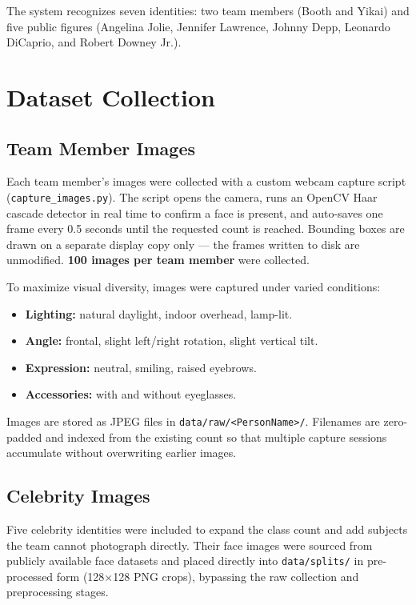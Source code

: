 \documentclass[12pt,a4paper]{article}
\begin{document}
The system recognizes seven identities: two team members (Booth and Yikai) and five public figures (Angelina Jolie, Jennifer Lawrence, Johnny Depp, Leonardo DiCaprio, and Robert Downey Jr.).

\section{Dataset Collection}

\subsection{Team Member Images}

Each team member's images were collected with a custom webcam capture script (\texttt{capture\_images.py}). The script opens the camera, runs an OpenCV Haar cascade detector in real time to confirm a face is present, and auto-saves one frame every 0.5 seconds until the requested count is reached. Bounding boxes are drawn on a separate display copy only — the frames written to disk are unmodified. \textbf{100 images per team member} were collected.

To maximize visual diversity, images were captured under varied conditions:
\begin{itemize}[noitemsep]
  \item \textbf{Lighting:} natural daylight, indoor overhead, lamp-lit.
  \item \textbf{Angle:} frontal, slight left/right rotation, slight vertical tilt.
  \item \textbf{Expression:} neutral, smiling, raised eyebrows.
  \item \textbf{Accessories:} with and without eyeglasses.
\end{itemize}

Images are stored as JPEG files in \texttt{data/raw/<PersonName>/}. Filenames are zero-padded and indexed from the existing count so that multiple capture sessions accumulate without overwriting earlier images.

\subsection{Celebrity Images}

Five celebrity identities were included to expand the class count and add subjects the team cannot photograph directly. Their face images were sourced from publicly available face datasets and placed directly into \texttt{data/splits/} in pre-processed form (128$\times$128 PNG crops), bypassing the raw collection and preprocessing stages.
\end{document}
